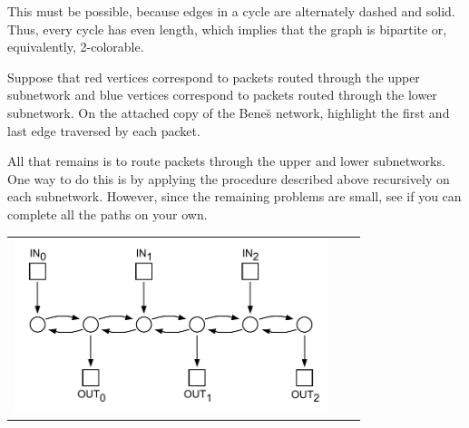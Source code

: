 \begin{problem}
\begin{solution}

This must be possible, because edges in a cycle are
alternately dashed and solid.  Thus, every cycle has even length,
which implies that the graph is bipartite or, equivalently,
2-colorable.


\end{solution}

\ppart Suppose that red vertices correspond to packets routed through
the upper subnetwork and blue vertices correspond to packets routed
through the lower subnetwork.  On the attached copy of the Bene\u{s}
network, highlight the first and last edge traversed by each packet.

\begin{solution}


\end{solution}

\ppart All that remains is to route packets through the upper and
lower subnetworks.  One way to do this is by applying the procedure
described above recursively on each subnetwork.  However, since the
remaining problems are small, see if you can complete all the paths 
on your own.

\begin{solution}


\end{solution}

\eparts
\end{problem}

\begin{center}
\begin{tabular}{ccc}
\includegraphics[height=2.0in]{figures/MQ_oct31_network}\\
\end{tabular}
\end{center}

